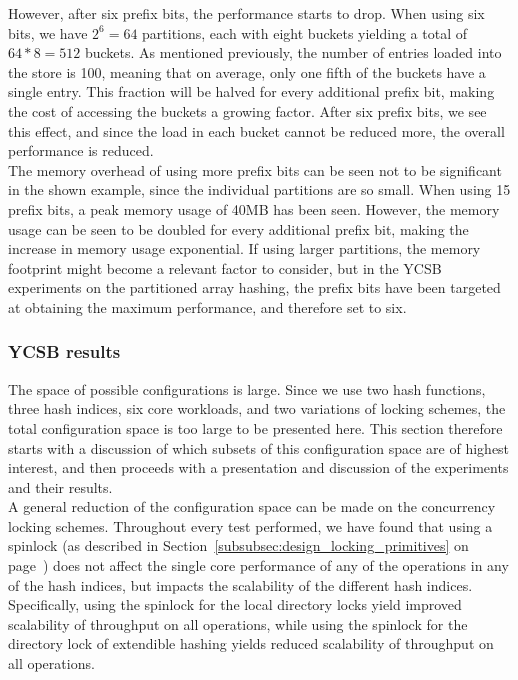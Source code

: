 \documentclass[11pt]{article} %
\begin{document}
However, after six prefix bits, the performance starts to drop. When using six bits, we have $2^6 = 64$ partitions, each with eight buckets yielding a total of $64*8 = 512$ buckets. As mentioned previously, the number of entries loaded into the store is 100, meaning that on average, only one fifth of the buckets have a single entry. This fraction will be halved for every additional prefix bit, making the cost of accessing the buckets a growing factor. After six prefix bits, we see this effect, and since the load in each bucket cannot be reduced more, the overall performance is reduced.\\

The memory overhead of using more prefix bits can be seen not to be significant in the shown example, since the individual partitions are so small. When using 15 prefix bits, a peak memory usage of 40MB has been seen. However, the memory usage can be seen to be doubled for every additional prefix bit, making the increase in memory usage exponential. If using larger partitions, the memory footprint might become a relevant factor to consider, but in the YCSB experiments on the partitioned array hashing, the prefix bits have been targeted at obtaining the maximum performance, and therefore set to six.
\subsubsection{YCSB results}
\label{subsubsec:ycsb_results}
The space of possible configurations is large. Since we use two hash functions, three hash indices, six core workloads, and two variations of locking schemes, the total configuration space is too large to be presented here. This section therefore starts with a discussion of which subsets of this configuration space are of highest interest, and then proceeds with a presentation and discussion of the experiments and their results.\\

A general reduction of the configuration space can be made on the concurrency locking schemes. Throughout every test performed, we have found that using a spinlock (as described in Section~\ref{subsubsec:design_locking_primitives} on page~\pageref{subsubsec:design_locking_primitives}) does not affect the single core performance of any of the operations in any of the hash indices, but impacts the scalability of the different hash indices. Specifically, using the spinlock for the local directory locks yield improved scalability of throughput on all operations, while using the spinlock for the directory lock of extendible hashing yields reduced scalability of throughput on all operations. \\
\end{document}
